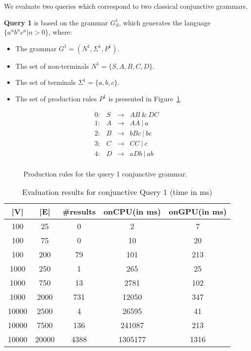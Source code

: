 We evaluate two queries which correspond to two classical conjunctive grammars.

\textbf{Query 1} is based on the grammar $G^1_S$, which generates the language $\{a^n b^n c^n | n > 0\}$, where:
\begin{itemize}
    \item The grammar $G^1 = (N^1, \Sigma^1, P^1)$.
    \item The set of non-terminals $N^1 = \{S, A, B, C, D\}$.
    \item The set of terminals $\Sigma^1 = \{a, b, c\}.$
    \item The set of production rules $P^1$ is presented in Figure~\ref{ProductionRulesQuery1}.
\end{itemize}

\begin{figure}[h]
    \[
    \begin{array}{rccl}
    0: & S & \rightarrow & AB ~\& ~DC \\ 
    1: & A & \rightarrow & AA ~|~ a \\ 
    2: & B & \rightarrow & bBc ~|~ bc \\ 
    3: & C & \rightarrow & CC ~|~ c \\ 
    4: & D & \rightarrow & aDb ~|~ ab \\ 
    \end{array}
    \]
    \caption{Production rules for the query 1 conjunctive grammar.}
    \label{ProductionRulesQuery1}
\end{figure}

\begin{table*}[ht]
    \centering
    \caption{Evaluation results for conjunctive Query 1 (time in ms)}
    \label{tbl1}
    
    \begin{tabular}{ | c | c | c | c | c |}
        \hline
        |V| & |E| & \#results & onCPU(in ms) & onGPU(in ms) \\
        \hline 
        \hline
        100 & 25 & 0 & 2 & 7\\
        100 & 75 & 0 & 10 & 20\\
        100 & 200 & 79 & 101 & 213\\
        1000  & 250 & 1 & 265 & 25\\
        1000 & 750 & 13 & 2781 & 102\\
        1000 & 2000 & 731 & 12050 & 347\\
        10000 & 2500 & 4 & 26595 & 41\\
        10000 & 7500 & 136 & 241087 & 213\\
        10000 & 20000 & 4388 & 1305177 & 1316\\
        \hline
    \end{tabular}
    
\end{table*}

